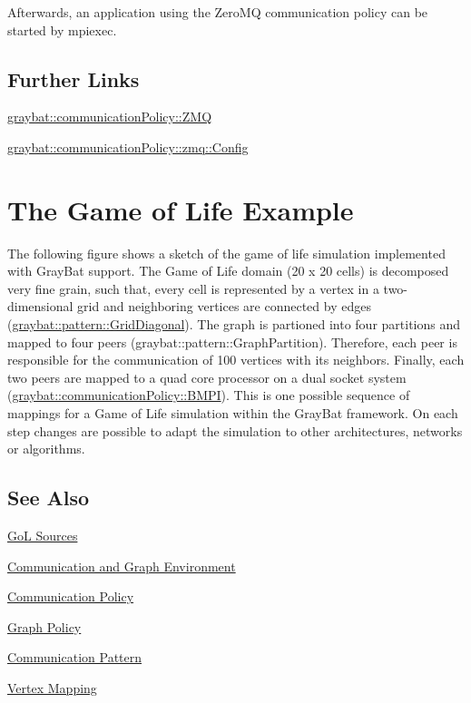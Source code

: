 Afterwards, an application using the Zero\+M\+Q communication policy can be started by {\ttfamily mpiexec}.




\subsection*{Further Links}


\begin{DoxyItemize}
\item \hyperlink{structgraybat_1_1communicationPolicy_1_1ZMQ}{graybat\+::communication\+Policy\+::\+Z\+M\+Q}
\item \hyperlink{structgraybat_1_1communicationPolicy_1_1zmq_1_1Config}{graybat\+::communication\+Policy\+::zmq\+::\+Config} 
\end{DoxyItemize}\hypertarget{gol}{}\section{The Game of Life Example}\label{gol}
The following figure shows a sketch of the game of life simulation implemented with Gray\+Bat support. The Game of Life domain (20 x 20 cells) is decomposed very fine grain, such that, every cell is represented by a vertex in a two-\/dimensional grid and neighboring vertices are connected by edges (\hyperlink{structgraybat_1_1pattern_1_1GridDiagonal}{graybat\+::pattern\+::\+Grid\+Diagonal}). The graph is partioned into four partitions and mapped to four peers (graybat\+::pattern\+::\+Graph\+Partition). Therefore, each peer is responsible for the communication of 100 vertices with its neighbors. Finally, each two peers are mapped to a quad core processor on a dual socket system (\hyperlink{structgraybat_1_1communicationPolicy_1_1BMPI}{graybat\+::communication\+Policy\+::\+B\+M\+P\+I}). This is one possible sequence of mappings for a Game of Life simulation within the Gray\+Bat framework. On each step changes are possible to adapt the simulation to other architectures, networks or algorithms.



\subsection*{See Also}


\begin{DoxyItemize}
\item \hyperlink{gol_8cpp-example}{Go\+L Sources}
\item \hyperlink{cage}{Communication and Graph Environment}
\item \hyperlink{communicationPolicy}{Communication Policy}
\item \hyperlink{graphPolicy}{Graph Policy}
\item \hyperlink{communicationPattern}{Communication Pattern}
\item \hyperlink{mapping}{Vertex Mapping} 
\end{DoxyItemize}